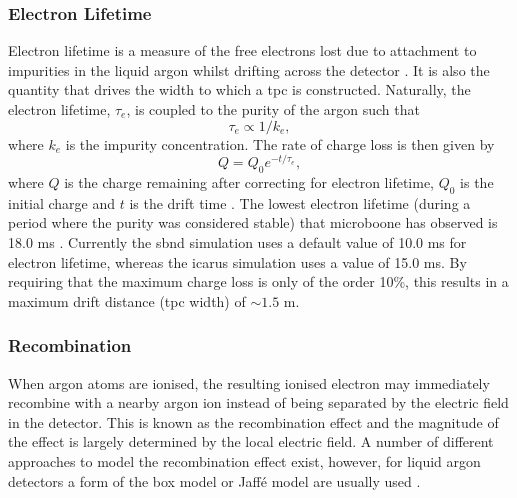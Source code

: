 \subsubsection{Electron Lifetime}
 Electron lifetime is a measure of the free electrons lost due to attachment to impurities in the liquid argon whilst drifting across the detector \cite{ArgoNeuT_electron_lifetime_paper}. It is also the quantity that drives the width to which a \gls{tpc} is constructed. Naturally, the electron lifetime, $\tau_{e}$, is coupled to the purity of the argon such that
 \begin{equation}
     \tau_{e} \propto 1/k_e,
 \end{equation}
 where $k_e$ is the impurity concentration. The rate of charge loss is then given by 
 \begin{equation}
     Q = Q_{0}e^{-t/\tau_e},
 \end{equation}
where $Q$ is the charge remaining after correcting for electron lifetime, $Q_0$ is the initial charge and $t$ is the drift time \cite{ArgoNeuT_electron_lifetime_paper}. The lowest electron lifetime (during a period where the purity was considered stable) that \gls{microboone} has observed is 18.0 ms \cite{microboone_electron_lifetime}. Currently the \gls{sbnd} simulation uses a default value of 10.0 ms for electron lifetime, whereas the \gls{icarus} simulation uses a value of 15.0 ms. By requiring that the maximum charge loss is only of the order 10\%, this results in a maximum drift distance (\gls{tpc} width) of $\sim1.5$ m. 
 
\subsubsection{Recombination}
When argon atoms are ionised, the resulting ionised electron may immediately recombine with a nearby argon ion instead of being separated by the electric field in the detector. This is known as the recombination effect and the magnitude of the effect is largely determined by the local electric field. A number of different approaches to model the recombination effect exist, however, for liquid argon detectors a form of the box model or Jaff\'{e} model are usually used \cite{LArTPC_book}.

